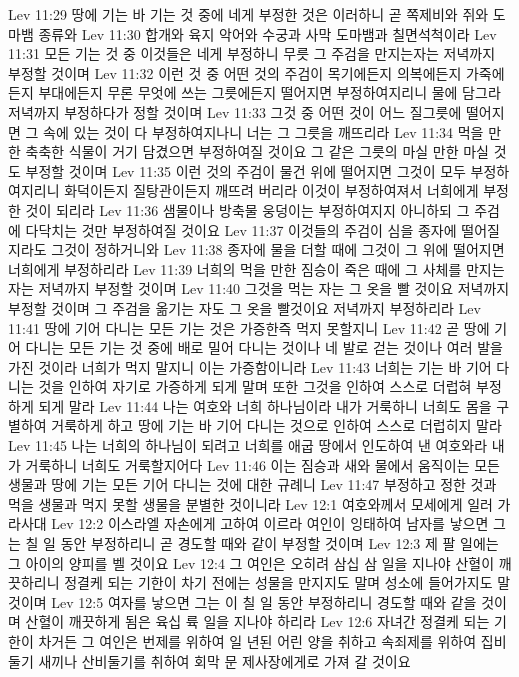 Lev 11:29  땅에 기는 바 기는 것 중에 네게 부정한 것은 이러하니 곧 쪽제비와 쥐와 도마뱀 종류와
Lev 11:30  합개와 육지 악어와 수궁과 사막 도마뱀과 칠면석척이라
Lev 11:31  모든 기는 것 중 이것들은 네게 부정하니 무릇 그 주검을 만지는자는 저녁까지 부정할 것이며
Lev 11:32  이런 것 중 어떤 것의 주검이 목기에든지 의복에든지 가죽에든지 부대에든지 무론 무엇에 쓰는 그릇에든지 떨어지면 부정하여지리니 물에 담그라 저녁까지 부정하다가 정할 것이며
Lev 11:33  그것 중 어떤 것이 어느 질그릇에 떨어지면 그 속에 있는 것이 다 부정하여지나니 너는 그 그릇을 깨뜨리라
Lev 11:34  먹을 만한 축축한 식물이 거기 담겼으면 부정하여질 것이요 그 같은 그릇의 마실 만한 마실 것도 부정할 것이며
Lev 11:35  이런 것의 주검이 물건 위에 떨어지면 그것이 모두 부정하여지리니 화덕이든지 질탕관이든지 깨뜨려 버리라 이것이 부정하여져서 너희에게 부정한 것이 되리라
Lev 11:36  샘물이나 방축물 웅덩이는 부정하여지지 아니하되 그 주검에 다닥치는 것만 부정하여질 것이요
Lev 11:37  이것들의 주검이 심을 종자에 떨어질지라도 그것이 정하거니와
Lev 11:38  종자에 물을 더할 때에 그것이 그 위에 떨어지면 너희에게 부정하리라
Lev 11:39  너희의 먹을 만한 짐승이 죽은 때에 그 사체를 만지는 자는 저녁까지 부정할 것이며
Lev 11:40  그것을 먹는 자는 그 옷을 빨 것이요 저녁까지 부정할 것이며 그 주검을 옮기는 자도 그 옷을 빨것이요 저녁까지 부정하리라
Lev 11:41  땅에 기어 다니는 모든 기는 것은 가증한즉 먹지 못할지니
Lev 11:42  곧 땅에 기어 다니는 모든 기는 것 중에 배로 밀어 다니는 것이나 네 발로 걷는 것이나 여러 발을 가진 것이라 너희가 먹지 말지니 이는 가증함이니라
Lev 11:43  너희는 기는 바 기어 다니는 것을 인하여 자기로 가증하게 되게 말며 또한 그것을 인하여 스스로 더럽혀 부정하게 되게 말라
Lev 11:44  나는 여호와 너희 하나님이라 내가 거룩하니 너희도 몸을 구별하여 거룩하게 하고 땅에 기는 바 기어 다니는 것으로 인하여 스스로 더럽히지 말라
Lev 11:45  나는 너희의 하나님이 되려고 너희를 애굽 땅에서 인도하여 낸 여호와라 내가 거룩하니 너희도 거룩할지어다
Lev 11:46  이는 짐승과 새와 물에서 움직이는 모든 생물과 땅에 기는 모든 기어 다니는 것에 대한 규례니
Lev 11:47  부정하고 정한 것과 먹을 생물과 먹지 못할 생물을 분별한 것이니라
Lev 12:1  여호와께서 모세에게 일러 가라사대
Lev 12:2  이스라엘 자손에게 고하여 이르라 여인이 잉태하여 남자를 낳으면 그는 칠 일 동안 부정하리니 곧 경도할 때와 같이 부정할 것이며
Lev 12:3  제 팔 일에는 그 아이의 양피를 벨 것이요
Lev 12:4  그 여인은 오히려 삼십 삼 일을 지나야 산혈이 깨끗하리니 정결케 되는 기한이 차기 전에는 성물을 만지지도 말며 성소에 들어가지도 말 것이며
Lev 12:5  여자를 낳으면 그는 이 칠 일 동안 부정하리니 경도할 때와 같을 것이며 산혈이 깨끗하게 됨은 육십 륙 일을 지나야 하리라
Lev 12:6  자녀간 정결케 되는 기한이 차거든 그 여인은 번제를 위하여 일 년된 어린 양을 취하고 속죄제를 위하여 집비둘기 새끼나 산비둘기를 취하여 회막 문 제사장에게로 가져 갈 것이요
